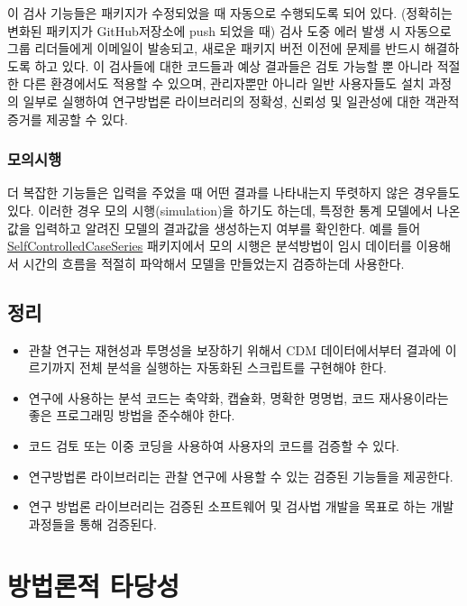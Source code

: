 \documentclass[11pt]{book}
\theoremstyle{definition}
\theoremstyle{definition}
\theoremstyle{definition}
\theoremstyle{remark}
\let\BeginKnitrBlock\begin \let\EndKnitrBlock\end
\begin{document}
이 검사 기능들은 패키지가 수정되었을 때 자동으로 수행되도록 되어 있다.
(정확히는 변화된 패키지가 GitHub저장소에 push 되었을 때) 검사 도중 에러
발생 시 자동으로 그룹 리더들에게 이메일이 발송되고, 새로운 패키지 버전
이전에 문제를 반드시 해결하도록 하고 있다. 이 검사들에 대한 코드들과
예상 결과들은 검토 가능할 뿐 아니라 적절한 다른 환경에서도 적용할 수
있으며, 관리자뿐만 아니라 일반 사용자들도 설치 과정의 일부로 실행하여
연구방법론 라이브러리의 정확성, 신뢰성 및 일관성에 대한 객관적 증거를
제공할 수 있다.

\subsection{모의시행}

더 복잡한 기능들은 입력을 주었을 때 어떤 결과를 나타내는지 뚜렷하지 않은
경우들도 있다. 이러한 경우 모의 시행(simulation)을 하기도 하는데, 특정한
통계 모델에서 나온 값을 입력하고 알려진 모델의 결과값을 생성하는지
여부를 확인한다. 예를 들어
\href{https://ohdsi.github.io/SelfControlledCaseSeries/}{SelfControlledCaseSeries}
패키지에서 모의 시행은 분석방법이 임시 데이터를 이용해서 시간의 흐름을
적절히 파악해서 모델을 만들었는지 검증하는데 사용한다.

\section{정리}

\BeginKnitrBlock{rmdsummary}
\begin{itemize}
\item
  관찰 연구는 재현성과 투명성을 보장하기 위해서 CDM 데이터에서부터
  결과에 이르기까지 전체 분석을 실행하는 자동화된 스크립트를 구현해야
  한다.
\item
  연구에 사용하는 분석 코드는 축약화, 캡슐화, 명확한 명명법, 코드
  재사용이라는 좋은 프로그래밍 방법을 준수해야 한다.
\item
  코드 검토 또는 이중 코딩을 사용하여 사용자의 코드를 검증할 수 있다.
\item
  연구방법론 라이브러리는 관찰 연구에 사용할 수 있는 검증된 기능들을
  제공한다.
\item
  연구 방법론 라이브러리는 검증된 소프트웨어 및 검사법 개발을 목표로
  하는 개발 과정들을 통해 검증된다.
\end{itemize}
\EndKnitrBlock{rmdsummary}

\chapter{방법론적 타당성}\label{MethodValidity}
\end{document}
